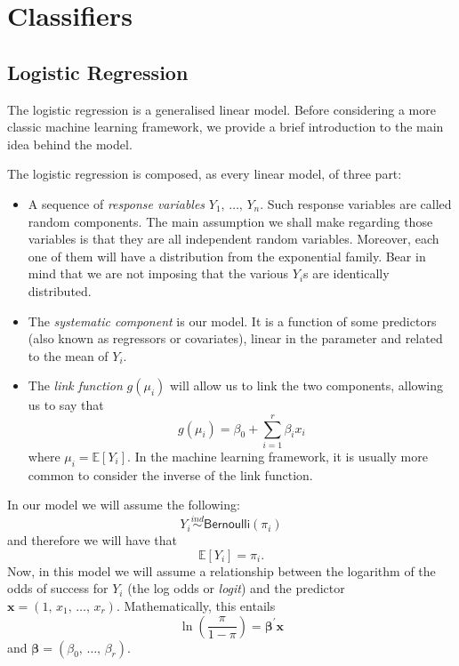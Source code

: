 \documentclass[a4paper]{article}
\begin{document}
\section{Classifiers}

\subsection{Logistic Regression}

The logistic regression is a generalised linear model. Before considering
a more classic machine learning framework, we provide a brief introduction
to the main idea behind the model. 

The logistic regression is composed, as every linear model, of three
part:
\begin{itemize}
	\item A sequence of \textit{response variables} $Y_{1},\,\ldots,\,Y_{n}$.
	Such response variables are called random components. The main assumption
	we shall make regarding those variables is that they are all independent
	random variables. Moreover, each one of them will have a distribution
	from the exponential family. Bear in mind that we are not imposing
	that the various $Y_{i}$s are identically distributed.
	\item The \textit{systematic component} is our model. It is a function of
	some predictors (also known as regressors or covariates), linear in
	the parameter and related to the mean of $Y_{i}$.
	\item The \textit{link function} $g\left(\mu_{i}\right)$ will allow us
	to link the two components, allowing us to say that 
	\begin{equation}
	g\left(\mu_{i}\right)=\beta_{0}+\sum_{i=1}^{r}\beta_{i}x_{i}\label{eq:-3}
	\end{equation}
	where $\mu_{i}=\mathbb{E}\left[Y_{i}\right]$. In the machine learning
	framework, it is usually more common to consider the inverse of the
	link function.
\end{itemize}
In our model we will assume the following:
\begin{equation}
Y_{i}\overset{ind}{\sim}\mathsf{Bernoulli}\left(\pi_{i}\right)\label{eq:}
\end{equation}
and therefore we will have that 
\begin{equation}
\mathbb{E}\left[Y_{i}\right]=\pi_{i}.\label{eq:-1}
\end{equation}
Now, in this model we will assume a relationship between the logarithm
of the odds of success for $Y_{i}$ (the log odds or \textit{logit})
and the predictor $\mathbf{x}=\left(1,\,x_{1},\,\ldots,\,x_{r}\right)$.
Mathematically, this entails
\begin{equation}
\ln\left(\frac{\pi}{1-\pi}\right)=\mathbf{\beta^{\prime}\mathbf{x}}\label{eq:-6}
\end{equation}
and $\mathbf{\beta}=\left(\beta_{0},\,\ldots,\,\beta_{r}\right)$.
\end{document}
